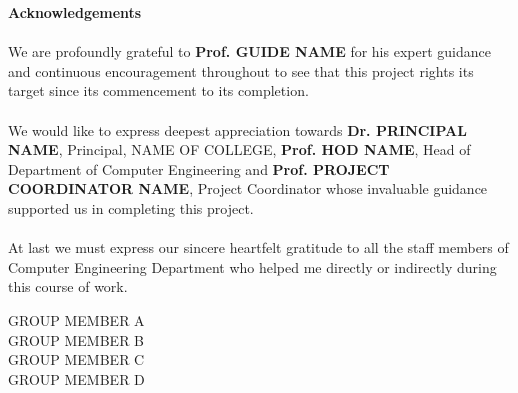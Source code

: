 \begin{center}
\thispagestyle{empty}
\LARGE{\textbf{Acknowledgements}}\\[1cm]
\end{center}
\linespread{1.13}
\large{\paragraph{}We are profoundly grateful to \textbf{Prof. GUIDE NAME} for his expert guidance
and continuous encouragement throughout to see that this project rights its
target since its commencement to its completion.}
\large{\paragraph{}We would like to express deepest appreciation towards \textbf{Dr. PRINCIPAL NAME},
Principal, NAME OF COLLEGE, \textbf{Prof. HOD NAME}, 
Head of Department of Computer Engineering and \textbf{Prof. PROJECT COORDINATOR NAME}, Project Coordinator whose
invaluable guidance supported us in completing this project.}
\large{\paragraph{}At last we must express our sincere heartfelt gratitude to all the staff members
of Computer Engineering Department who helped me directly or indirectly during this course of work.}
\begin{flushright}
{
GROUP MEMBER A\\
GROUP MEMBER B\\
GROUP MEMBER C\\
GROUP MEMBER D
}
\end{flushright}
\newpage
